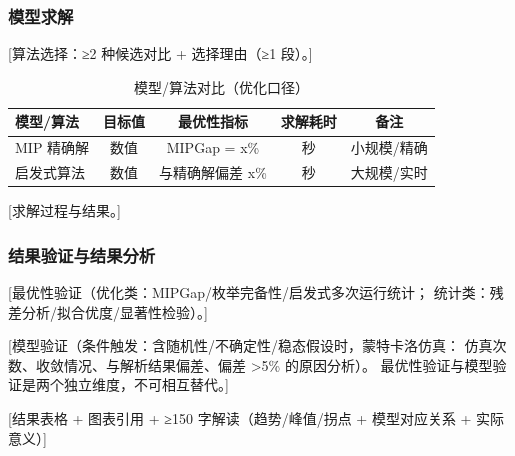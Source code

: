 \documentclass[12pt,a4paper]{ctexart}
\begin{document}
\subsubsection{模型求解}

[算法选择：≥2 种候选对比 + 选择理由（≥1 段）。]

\begin{table}[H]
\centering
\caption{模型/算法对比（优化口径）}
\label{tab:model_compare}
\begin{tabular}{lcccc}
\toprule
模型/算法 & 目标值 & 最优性指标 & 求解耗时 & 备注 \\
\midrule
{MIP 精确解} & {数值} & MIPGap = {x}\% & {秒} & {小规模/精确} \\
{启发式算法} & {数值} & 与精确解偏差 {x}\% & {秒} & {大规模/实时} \\
\bottomrule
\end{tabular}
\end{table}

[求解过程与结果。]

\subsubsection{结果验证与结果分析}

[最优性验证（优化类：MIPGap/枚举完备性/启发式多次运行统计；
统计类：残差分析/拟合优度/显著性检验）。]


[模型验证（条件触发：含随机性/不确定性/稳态假设时，蒙特卡洛仿真：
仿真次数、收敛情况、与解析结果偏差、偏差 >5\% 的原因分析）。
最优性验证与模型验证是两个独立维度，不可相互替代。]

[结果表格 + 图表引用 + ≥150 字解读（趋势/峰值/拐点 + 模型对应关系 + 实际意义）]

\end{document}
